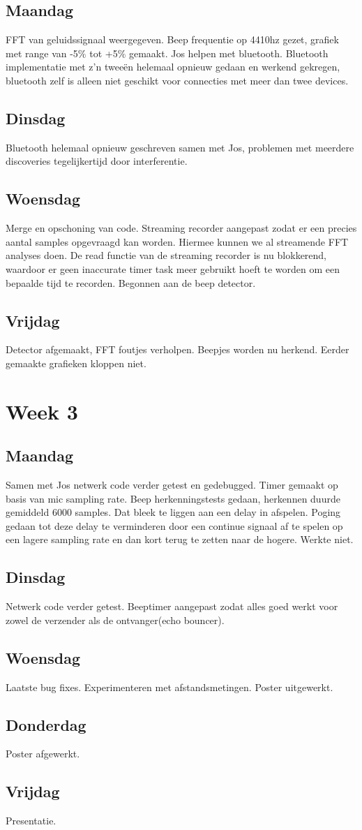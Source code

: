 \documentclass[12pt]{article}
\begin{document}
\subsection*{Maandag}
FFT van geluidssignaal weergegeven. Beep frequentie op 4410hz gezet, grafiek met range van -5$\%$ tot +5$\%$ gemaakt. Jos helpen met bluetooth. Bluetooth implementatie met z'n tweeën helemaal opnieuw gedaan en werkend gekregen, bluetooth zelf is alleen niet geschikt voor connecties met meer dan twee devices.

\subsection*{Dinsdag}
Bluetooth helemaal opnieuw geschreven samen met Jos, problemen met meerdere discoveries tegelijkertijd door interferentie.

\subsection*{Woensdag}
Merge en opschoning van code. Streaming recorder aangepast zodat er een precies aantal samples opgevraagd kan worden. Hiermee kunnen we al streamende FFT analyses doen. De read functie van de streaming recorder is nu blokkerend, waardoor er geen inaccurate timer task meer gebruikt hoeft te worden om een bepaalde tijd te recorden. Begonnen aan de beep detector.

\subsection*{Vrijdag}
Detector afgemaakt, FFT foutjes verholpen. Beepjes worden nu herkend.
Eerder gemaakte grafieken kloppen niet.

\section*{Week 3}
\subsection*{Maandag}
Samen met Jos netwerk code verder getest en gedebugged. Timer gemaakt op basis van mic sampling rate. Beep herkenningstests gedaan, herkennen duurde gemiddeld 6000 samples. Dat bleek te liggen aan een delay in afspelen. Poging gedaan tot deze delay te verminderen door een continue signaal af te spelen op een lagere sampling rate en dan kort terug te zetten naar de hogere. Werkte niet.

\subsection*{Dinsdag}
Netwerk code verder getest. Beeptimer aangepast zodat alles goed werkt voor zowel de verzender als de ontvanger(echo bouncer).

\subsection*{Woensdag}
Laatste bug fixes. Experimenteren met afstandsmetingen. Poster uitgewerkt.

\subsection*{Donderdag}
Poster afgewerkt.

\subsection*{Vrijdag}
Presentatie.
\end{document}
